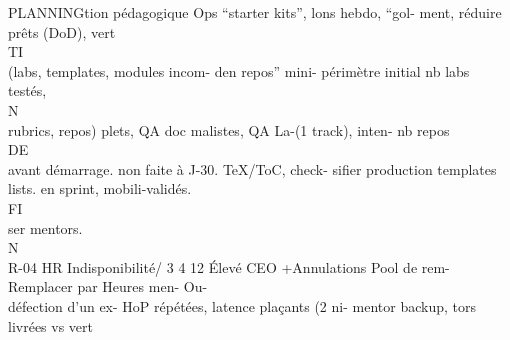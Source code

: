 \documentclass[12pt,landscape,a4paper]{article}
\begin{document}
PLANNINGtion pédagogique               Ops      “starter     kits”, lons hebdo, “gol- ment,     réduire prêts (DoD), vert\\
\vspace{0.5em}
\vspace{0.5em}
\vspace{0.5em}
\vspace{0.5em}
TI\\
(labs, templates,                       modules incom- den repos” mini- périmètre initial nb labs testés,\\
\vspace{0.5em}
\vspace{0.5em}
\vspace{0.5em}
\vspace{0.5em}
N\\
rubrics,   repos)                       plets, QA doc malistes, QA La-(1 track), inten- nb               repos\\
\vspace{0.5em}
\vspace{0.5em}
\vspace{0.5em}
\vspace{0.5em}
DE\\
avant démarrage.                        non faite à J-30. TeX/ToC, check- sifier production templates\\
lists.            en sprint, mobili-validés.\\
\vspace{0.5em}
\vspace{0.5em}
\vspace{0.5em}
\vspace{0.5em}
FI\\
ser mentors.\\
\vspace{0.5em}
\vspace{0.5em}
\vspace{0.5em}
\vspace{0.5em}
N\\
R-04   HR       Indisponibilité/ 3 4 12 Élevé CEO     +Annulations       Pool de rem- Remplacer par Heures men- Ou-\\
défection d’un ex-            HoP      répétées, latence plaçants (2 ni- mentor backup, tors livrées vs vert\\
\vspace{0.5em}
\vspace{0.5em}
\vspace{0.5em}
\vspace{0.5em}
\end{document}
